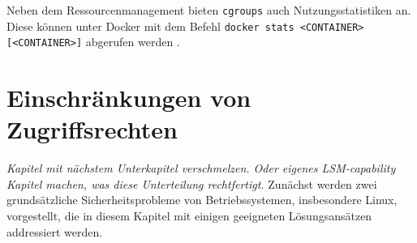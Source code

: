 \documentclass[../main.tex]{subfiles}
\begin{document}
		Neben dem Ressourcenmanagement bieten \texttt{\acrshort{cgroups}} auch Nutzungsstatistiken an. Diese können unter Docker mit dem Befehl \texttt{docker stats <CONTAINER> [<CONTAINER>]} abgerufen werden \cite{dockerMetrics}.












  \section{Einschränkungen von Zugriffsrechten}
		\emph{Kapitel mit nächstem Unterkapitel verschmelzen. Oder eigenes LSM-capability Kapitel machen, was diese Unterteilung rechtfertigt.}
		Zunächst werden zwei grundsätzliche Sicherheitsprobleme von Betriebssystemen, insbesondere Linux, vorgestellt, die in diesem Kapitel mit einigen geeigneten Lösungsansätzen addressiert werden.
\end{document}
